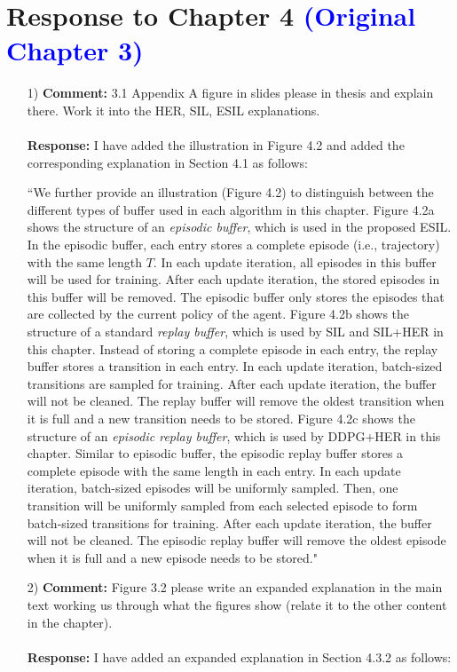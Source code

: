 \documentclass[11pt]{article}
\begin{document}
\newpage
\section*{Response to Chapter 4 \textcolor{blue}{(Original Chapter 3)}}
\begin{enumerate}
\item[1)] \textbf{Comment:} 3.1 Appendix A figure in slides please in thesis and explain there. Work it into the HER, SIL, ESIL explanations.\\ \\
\textbf{Response:} I have added the illustration in Figure 4.2 and added the corresponding explanation in Section 4.1 as follows:

``We further provide an illustration (Figure 4.2) to distinguish between the different types of buffer used in each algorithm in this chapter. Figure 4.2a shows the structure of an \textit{episodic buffer}, which is used in the proposed ESIL. In the episodic buffer, each entry stores a complete episode (i.e., trajectory) with the same length $T$. In each update iteration, all episodes in this buffer will be used for training. After each update iteration, the stored episodes in this buffer will be removed. The episodic buffer only stores the episodes that are collected by the current policy of the agent. Figure 4.2b shows the structure of a standard \textit{replay buffer}, which is used by SIL and SIL+HER in this chapter. Instead of storing a complete episode in each entry, the replay buffer stores a transition in each entry. In each update iteration, batch-sized transitions are sampled for training. After each update iteration, the buffer will not be cleaned. The replay buffer will remove the oldest transition when it is full and a new transition needs to be stored. Figure 4.2c shows the structure of an \textit{episodic replay buffer}, which is used by DDPG+HER in this chapter. Similar to episodic buffer, the episodic replay buffer stores a complete episode with the same length in each entry. In each update iteration, batch-sized episodes will be uniformly sampled. Then, one transition will be uniformly sampled from each selected episode to form batch-sized transitions for training. After each update iteration, the buffer will not be cleaned. The episodic replay buffer will remove the oldest episode when it is full and a new episode needs to be stored."

\item[2)] \textbf{Comment:} Figure 3.2 please write an expanded explanation in the main text working us through what the figures show (relate it to the other content in the chapter).\\ \\
\textbf{Response:} I have added an expanded explanation in Section 4.3.2 as follows:


\end{enumerate}
\end{document}
